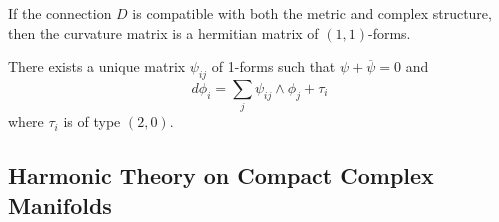 \begin{prop}

	If the connection $D$ is compatible with both the metric and complex structure, then the curvature matrix is a hermitian matrix of $(1,1)$-forms.

\end{prop}

\begin{lem}

There exists a unique matrix $ \psi_{ ij }$ of 1-forms such that $ \psi + \overline{ \psi} = 0$ and 
\[
d \phi_i = \sum_j \psi_{ ij } \wedge \phi_j + \tau_i
\]
where $ \tau_i$ is of type $ (2,0)$.

\end{lem}
\subsection{Harmonic Theory on Compact Complex Manifolds}























